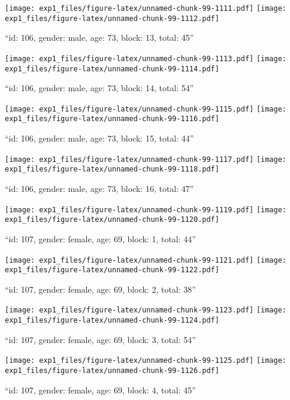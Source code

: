\documentclass[,]{article}
\begin{document}
\texttt{[image: exp1\_files/figure-latex/unnamed-chunk-99-1111.pdf]}
\texttt{[image: exp1\_files/figure-latex/unnamed-chunk-99-1112.pdf]}

\newpage
[1] 

``id: 106, gender: male, age: 73, block: 13, total: 45''

\texttt{[image: exp1\_files/figure-latex/unnamed-chunk-99-1113.pdf]}
\texttt{[image: exp1\_files/figure-latex/unnamed-chunk-99-1114.pdf]}

\newpage
[1] 

``id: 106, gender: male, age: 73, block: 14, total: 54''

\texttt{[image: exp1\_files/figure-latex/unnamed-chunk-99-1115.pdf]}
\texttt{[image: exp1\_files/figure-latex/unnamed-chunk-99-1116.pdf]}

\newpage
[1] 

``id: 106, gender: male, age: 73, block: 15, total: 44''

\texttt{[image: exp1\_files/figure-latex/unnamed-chunk-99-1117.pdf]}
\texttt{[image: exp1\_files/figure-latex/unnamed-chunk-99-1118.pdf]}

\newpage
[1] 

``id: 106, gender: male, age: 73, block: 16, total: 47''

\texttt{[image: exp1\_files/figure-latex/unnamed-chunk-99-1119.pdf]}
\texttt{[image: exp1\_files/figure-latex/unnamed-chunk-99-1120.pdf]}

\newpage
[1] 

``id: 107, gender: female, age: 69, block: 1, total: 44''

\texttt{[image: exp1\_files/figure-latex/unnamed-chunk-99-1121.pdf]}
\texttt{[image: exp1\_files/figure-latex/unnamed-chunk-99-1122.pdf]}

\newpage
[1] 

``id: 107, gender: female, age: 69, block: 2, total: 38''

\texttt{[image: exp1\_files/figure-latex/unnamed-chunk-99-1123.pdf]}
\texttt{[image: exp1\_files/figure-latex/unnamed-chunk-99-1124.pdf]}

\newpage
[1] 

``id: 107, gender: female, age: 69, block: 3, total: 54''

\texttt{[image: exp1\_files/figure-latex/unnamed-chunk-99-1125.pdf]}
\texttt{[image: exp1\_files/figure-latex/unnamed-chunk-99-1126.pdf]}

\newpage
[1] 

``id: 107, gender: female, age: 69, block: 4, total: 45''
\end{document}
